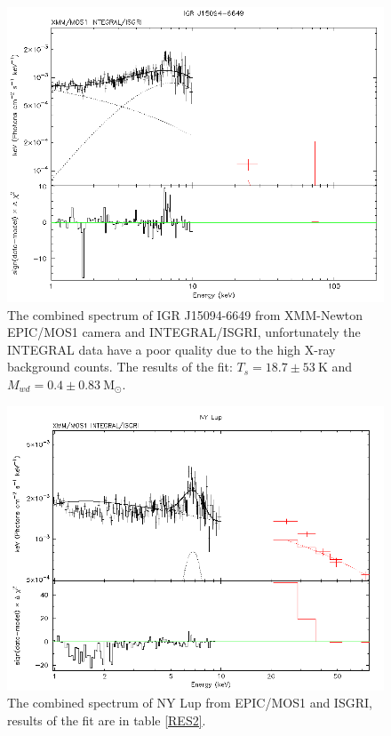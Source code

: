 \documentclass[oneside,a4paper,11pt]{report}
\begin{document}
\begin{figure}[!hbt]
\centering
\includegraphics[totalheight=8cm]{spec/1}
\caption{The combined spectrum of IGR J15094-6649 from XMM-Newton EPIC/MOS1 camera and INTEGRAL/ISGRI, unfortunately the INTEGRAL data have a poor quality due to the high X-ray background counts. 
The results of the fit: $T_s = 18.7 \pm 53\:\mathrm{K}$ and $M_{wd} = 0.4 \pm 0.83 \:\mathrm{M_{\odot}}$.}
\label{sp1} 
\end{figure}

\begin{figure}[!hbt]
\centering
\includegraphics[totalheight=8cm]{spec/2}
\caption{The combined spectrum of NY Lup from EPIC/MOS1 and ISGRI, results of the fit are in table \ref{RES2}.}
\label{sp2} 
\end{figure}
\end{document}
